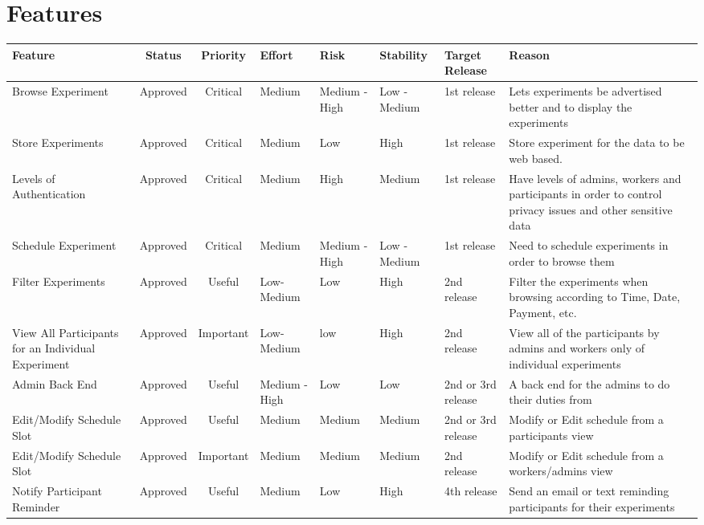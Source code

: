 \documentclass{article}
\begin{document}
\section{Features}
\begin{table}[!hb]\footnotesize
    \begin{tabular}{|p{2.5cm}|c|c|p{1.25cm}|p{1.5cm}|p{1.5cm}|p{1.25cm}|p{3.25cm}|}
        \hline
        Feature & Status & Priority & Effort & Risk  & Stability & Target Release & Reason \\
        \hline
        Browse Experiment & Approved & Critical & Medium & Medium - High & Low - Medium & 1st release & Lets experiments be advertised better and to display the experiments \\
        \hline
        Store Experiments & Approved & Critical & Medium & Low   & High  & 1st release & Store experiment for the data to be web based. \\
        \hline
        Levels of Authentication & Approved & Critical & Medium & High  & Medium & 1st release  & Have levels of admins, workers and participants in order to control privacy issues and other sensitive data \\
        \hline
        Schedule Experiment & Approved & Critical & Medium & Medium - High & Low - Medium & 1st release   & Need to schedule experiments in order to browse them \\
        \hline
        Filter Experiments & Approved & Useful & Low-Medium & Low   & High  & 2nd release & Filter the experiments when browsing according to Time, Date, Payment, etc. \\
        \hline
        View All Participants for an Individual Experiment & Approved & Important & Low-Medium & low   & High  & 2nd release  & View all of the participants by admins and workers only of individual experiments \\
        \hline
        Admin Back End & Approved & Useful & Medium - High & Low   & Low   & 2nd or 3rd release  & A back end for the admins to do their duties from \\
        \hline
        Edit/Modify Schedule Slot & Approved & Useful & Medium & Medium & Medium & 2nd or 3rd release   & Modify or Edit schedule from a participants view \\
        \hline
        Edit/Modify Schedule Slot & Approved & Important & Medium & Medium & Medium & 2nd release  & Modify or Edit schedule from a workers/admins view \\
        \hline
        Notify Participant Reminder & Approved & Useful & Medium & Low   & High  & 4th release  & Send an email or text reminding participants for their experiments \\

\end{tabular}
\end{table}
\end{document}
